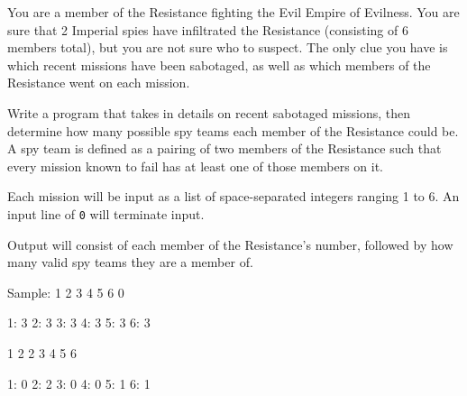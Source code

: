 

You are a member of the Resistance fighting the Evil Empire of Evilness. You are sure that 2 Imperial spies have infiltrated the Resistance (consisting of 6 members total), but you are not sure who to suspect. The only clue you have is which recent missions have been sabotaged, as well as which members of the Resistance went on each mission.

Write a program that takes in details on recent sabotaged missions, then determine how many possible spy teams each member of the Resistance could be. A spy team is defined as a pairing of two members of the Resistance such that every mission known to fail has at least one of those members on it.

Each mission will be input as a list of space-separated integers ranging 1 to 6. An input line of \texttt{0} will terminate input.

Output will consist of each member of the Resistance's number, followed by how many valid spy teams they are a member of.

Sample:
1 2 3
4 5 6
0

1: 3
2: 3
3: 3
4: 3
5: 3
6: 3


1 2
2 3 4
5 6

1: 0
2: 2
3: 0
4: 0
5: 1
6: 1
